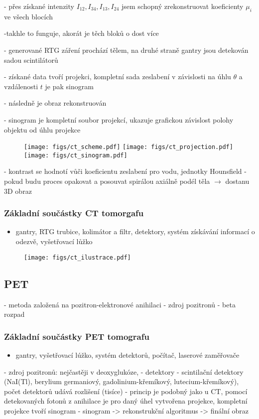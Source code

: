 - přes získané intenzity $I_{12}, I_{34}, I_{13}, I_{24}$ jsem schopný zrekonstruovat koeficienty $\mu_{i}$ ve všech blocích

-takhle to funguje, akorát je těch bloků o dost více


- generované RTG záření prochází tělem, na druhé straně gantry jsou detekován sadou scintilátorů

- získané data tvoří projekci, kompletní sada zeslabení v závislosti na úhlu $\theta$ a vzdálenosti $t$ je pak sinogram

- následně je obraz rekonstruován 

- sinogram je kompletní soubor projekcí, ukazuje grafickou závislost polohy objektu od úhlu projekce
\begin{figure}[ht!]
    \centering
    \texttt{[image: figs/ct\_scheme.pdf]}
    \texttt{[image: figs/ct\_projection.pdf]}
    \texttt{[image: figs/ct\_sinogram.pdf]}
    
\end{figure}
- kontrast se hodnotí vůči koeficientu zeslabení pro vodu, jednotky Hounsfield
- pokud budu proces opakovat a posouvat spirálou axiálně podél těla $\longrightarrow$ dostanu 3D obraz


\subsubsection{Základní součástky CT tomorgafu}
\begin{itemize}
    \item gantry, RTG trubice, kolimátor a filtr, detektory, systém získávání informací o odezvě, vyšetřovací lůžko
\end{itemize}
\begin{figure}[ht!]
    \centering
    \texttt{[image: figs/ct\_ilustrace.pdf]}
\end{figure}

\newpage
\subsection{PET} 
- metoda založená na pozitron-elektronové anihilaci
- zdroj pozitronů - beta rozpad
\subsubsection{Základní součástky PET tomografu}
\begin{itemize}
    \item gantry, vyšetřovací lúžko, systém detektorů, počítač, laserové zaměřovače
\end{itemize}
- zdroj pozitronů: nejčastěji  v deoxyglukóze, 
- detektory - scintilační detektory (NaI(Tl), berylium germaniový, gadolinium-křemíkový, lutecium-křemíkový), počet detektorů udává rozlišení (tisíce)
- princip je podobný jako u CT, pomocí detekovaných fotonů z anihilace je pro daný úhel vytvořena projekce, kompletní projekce tvoří sinogram
- sinogram -> rekonstrukční algoritmus -> finální obraz
